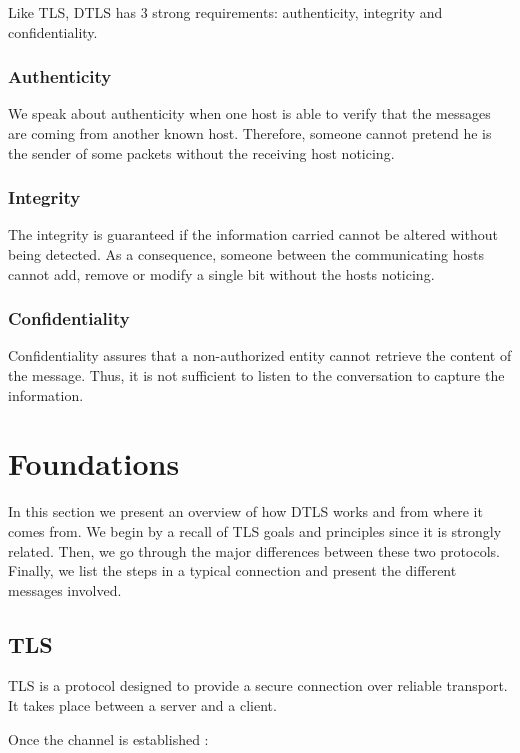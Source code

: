 Like TLS, DTLS has 3 strong requirements: authenticity, integrity and confidentiality.

\subsubsection{Authenticity}

We speak about authenticity when one host is able to verify that the messages are coming from another known host. Therefore, someone cannot pretend he is the sender of some packets without the receiving host noticing.

\subsubsection{Integrity}

The integrity is guaranteed if the information carried cannot be altered without being detected. As a consequence, someone between the communicating hosts cannot add, remove or modify a single bit without the hosts noticing.


\subsubsection{Confidentiality}

Confidentiality assures that a non-authorized entity cannot retrieve the content of the message. Thus, it is not sufficient to listen to the conversation to capture the information.


\section{Foundations}

In this section we present an overview of how DTLS works and from where it comes from. We begin by a recall of TLS goals and principles since it is strongly related. Then, we go through the major differences between these two protocols. Finally, we list the steps in a typical connection and present the different messages involved. 

\subsection{TLS}

TLS is a protocol designed to provide a secure connection over reliable transport. It takes place between a server and a client. 

Once the channel is established :

